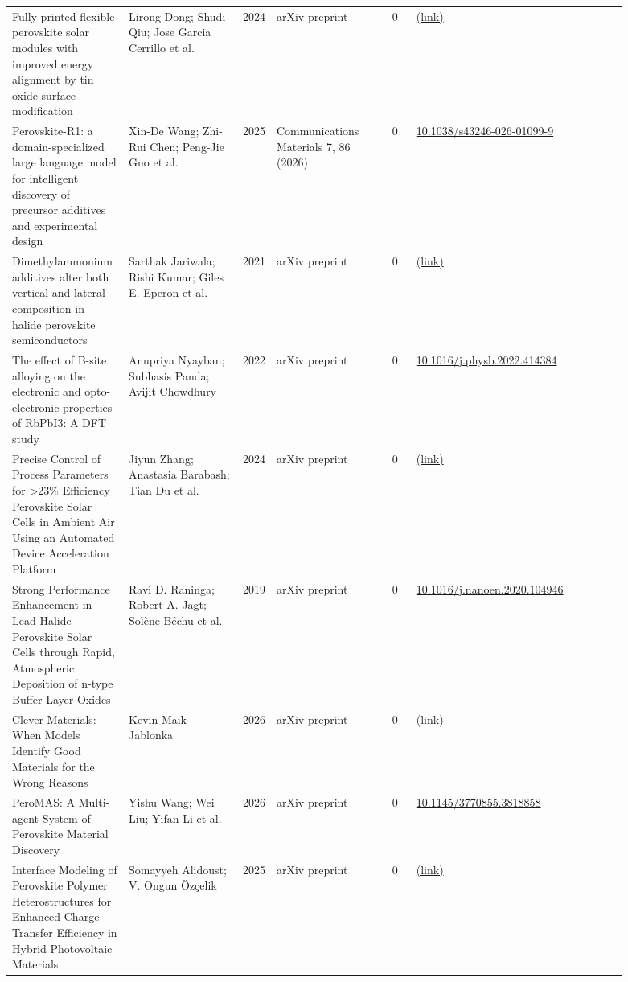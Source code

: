 \documentclass[10pt,a4paper]{article}
\begin{document}
{\begin{longtable}{p{0.197\linewidth}p{0.197\linewidth}p{0.043\linewidth}p{0.197\linewidth}p{0.043\linewidth}p{0.117\linewidth}p{0.098\linewidth}}
Fully printed flexible perovskite solar modules with improved energy alignment by tin oxide surface modification & Lirong Dong; Shudi Qiu; Jose Garcia Cerrillo et al. & 2024 & arXiv preprint & 0 & \href{http://arxiv.org/abs/2406.03123v1}{(link)} &  \\
Perovskite-R1: a domain-specialized large language model for intelligent discovery of precursor additives and experimental design & Xin-De Wang; Zhi-Rui Chen; Peng-Jie Guo et al. & 2025 & Communications Materials 7, 86 (2026) & 0 & \href{https://doi.org/10.1038/s43246-026-01099-9}{10.1038/s43246-026-01099-9} &  \\
Dimethylammonium additives alter both vertical and lateral composition in halide perovskite semiconductors & Sarthak Jariwala; Rishi Kumar; Giles E. Eperon et al. & 2021 & arXiv preprint & 0 & \href{http://arxiv.org/abs/2110.11458v1}{(link)} &  \\
The effect of B-site alloying on the electronic and opto-electronic properties of RbPbI3: A DFT study & Anupriya Nyayban; Subhasis Panda; Avijit Chowdhury & 2022 & arXiv preprint & 0 & \href{https://doi.org/10.1016/j.physb.2022.414384}{10.1016/j.physb.2022.414384} &  \\
Precise Control of Process Parameters for >23\% Efficiency Perovskite Solar Cells in Ambient Air Using an Automated Device Acceleration Platform & Jiyun Zhang; Anastasia Barabash; Tian Du et al. & 2024 & arXiv preprint & 0 & \href{http://arxiv.org/abs/2404.00106v1}{(link)} &  \\
Strong Performance Enhancement in Lead-Halide Perovskite Solar Cells through Rapid, Atmospheric Deposition of n-type Buffer Layer Oxides & Ravi D. Raninga; Robert A. Jagt; Solène Béchu et al. & 2019 & arXiv preprint & 0 & \href{https://doi.org/10.1016/j.nanoen.2020.104946}{10.1016/j.nanoen.2020.104946} &  \\
Clever Materials: When Models Identify Good Materials for the Wrong Reasons & Kevin Maik Jablonka & 2026 & arXiv preprint & 0 & \href{http://arxiv.org/abs/2602.17730v1}{(link)} &  \\
PeroMAS: A Multi-agent System of Perovskite Material Discovery & Yishu Wang; Wei Liu; Yifan Li et al. & 2026 & arXiv preprint & 0 & \href{https://doi.org/10.1145/3770855.3818858}{10.1145/3770855.3818858} &  \\
Interface Modeling of Perovskite Polymer Heterostructures for Enhanced Charge Transfer Efficiency in Hybrid Photovoltaic Materials & Somayyeh Alidoust; V. Ongun Özçelik & 2025 & arXiv preprint & 0 & \href{http://arxiv.org/abs/2512.22321v1}{(link)} &  \\

\end{longtable}}
\end{document}
